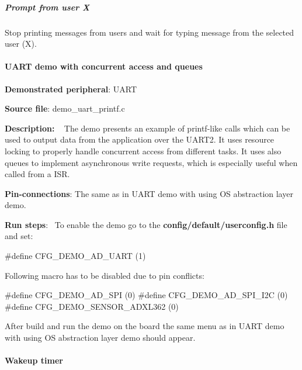 \subparagraph*{Prompt from user X}

Stop printing messages from users and wait for typing message from the selected user (X).

\paragraph*{U\+A\+R\+T demo with concurrent access and queues}


\begin{DoxyItemize}
\item {\bfseries Demonstrated peripheral}\+: U\+A\+R\+T
\item {\bfseries Source file}\+: demo\+\_\+uart\+\_\+printf.\+c
\item {\bfseries Description\+:} ~\newline
 The demo presents an example of printf-\/like calls which can be used to output data from the application over the U\+A\+R\+T2. It uses resource locking to properly handle concurrent access from different tasks. It uses also queues to implement asynchronous write requests, which is especially useful when called from a I\+S\+R.
\item {\bfseries Pin-\/connections}\+: The same as in \textquotesingle{}U\+A\+R\+T demo with using O\+S abstraction layer\textquotesingle{} demo.
\item {\bfseries Run steps}\+:~\newline
 To enable the demo go to the {\bfseries {\ttfamily config/default/userconfig.\+h}} file and set\+: 
\begin{DoxyCode}
\textcolor{preprocessor}{#define CFG\_DEMO\_AD\_UART        (1)}
\end{DoxyCode}
 Following macro has to be disabled due to pin conflicts\+: 
\begin{DoxyCode}
\textcolor{preprocessor}{#define CFG\_DEMO\_AD\_SPI         (0)}
\textcolor{preprocessor}{#define CFG\_DEMO\_AD\_SPI\_I2C     (0)}
\textcolor{preprocessor}{#define CFG\_DEMO\_SENSOR\_ADXL362 (0)}
\end{DoxyCode}
 After build and run the demo on the board the same menu as in \textquotesingle{}U\+A\+R\+T demo with using O\+S abstraction layer\textquotesingle{} demo should appear.
\end{DoxyItemize}

\paragraph*{Wakeup timer}


